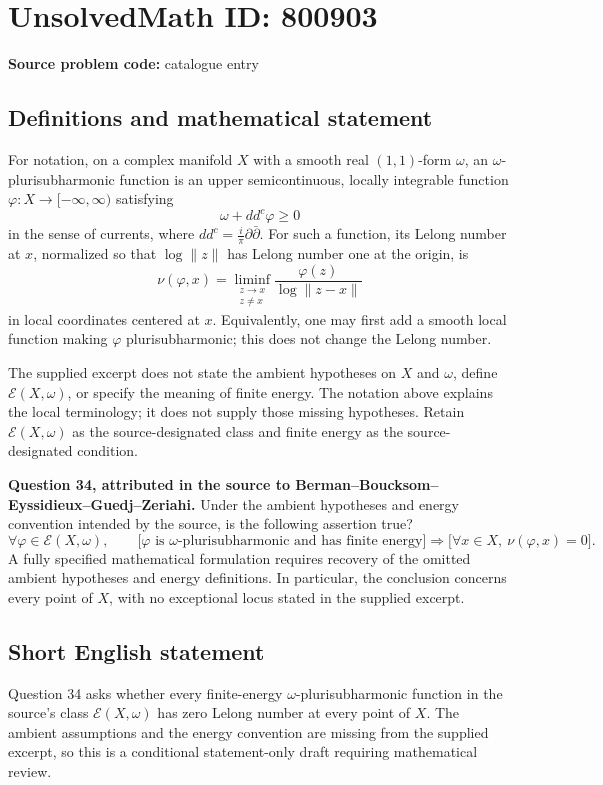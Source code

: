 \documentclass[11pt]{article}
\begin{document}
\section*{UnsolvedMath ID: 800903}
\textbf{Source problem code:} catalogue entry
\subsection{Definitions and mathematical statement}
For notation, on a complex manifold \(X\) with a smooth real \((1,1)\)-form \(\omega\), an \(\omega\)-plurisubharmonic function is an upper semicontinuous, locally integrable function \(\varphi:X\to[-\infty,\infty)\) satisfying
\[
\omega+dd^c\varphi\geq 0
\]
in the sense of currents, where \(dd^c=\frac{i}{\pi}\partial\bar\partial\). For such a function, its Lelong number at \(x\), normalized so that \(\log\lVert z\rVert\) has Lelong number one at the origin, is
\[
\nu(\varphi,x)=\liminf_{\substack{z\to x\\z\ne x}}\frac{\varphi(z)}{\log\lVert z-x\rVert}
\]
in local coordinates centered at \(x\). Equivalently, one may first add a smooth local function making \(\varphi\) plurisubharmonic; this does not change the Lelong number.

The supplied excerpt does not state the ambient hypotheses on \(X\) and \(\omega\), define \(\mathcal E(X,\omega)\), or specify the meaning of finite energy. The notation above explains the local terminology; it does not supply those missing hypotheses. Retain \(\mathcal E(X,\omega)\) as the source-designated class and finite energy as the source-designated condition.

\textbf{Question 34, attributed in the source to Berman--Boucksom--Eyssidieux--Guedj--Zeriahi.} Under the ambient hypotheses and energy convention intended by the source, is the following assertion true?
\[
\forall\varphi\in\mathcal E(X,\omega),\qquad
\bigl[\varphi\text{ is }\omega\text{-plurisubharmonic and has finite energy}\bigr]
\Longrightarrow
\bigl[\forall x\in X,\ \nu(\varphi,x)=0\bigr].
\]
A fully specified mathematical formulation requires recovery of the omitted ambient hypotheses and energy definitions. In particular, the conclusion concerns every point of \(X\), with no exceptional locus stated in the supplied excerpt.
\subsection{Short English statement}
Question 34 asks whether every finite-energy \(\omega\)-plurisubharmonic function in the source's class \(\mathcal E(X,\omega)\) has zero Lelong number at every point of \(X\). The ambient assumptions and the energy convention are missing from the supplied excerpt, so this is a conditional statement-only draft requiring mathematical review.
\end{document}
